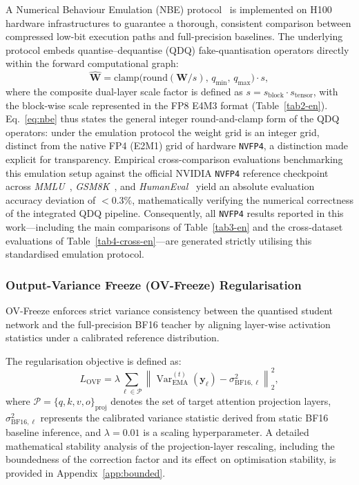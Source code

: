 \documentclass[a4paper,fleqn]{cas-sc}
\begin{document}
A Numerical Behaviour Emulation (NBE) protocol~\citep{NVIDIA2024TRTLLMReleaseNotes,NVIDIA2024TensorRTLLMDocs} is implemented on H100 hardware infrastructures to guarantee a thorough, consistent comparison between compressed low-bit execution paths and full-precision baselines. The underlying protocol embeds quantise--dequantise (QDQ) fake-quantisation operators directly within the forward computational graph:
\begin{equation}
\label{eq:nbe}
\widehat{\bm{W}} = \text{clamp}\!\bigl(\text{round}(\bm{W}/s),\,q_{\min},\,q_{\max}\bigr) \cdot s,
\end{equation}
where the composite dual-layer scale factor is defined as $s = s_{\text{block}} \cdot s_{\text{tensor}}$, with the block-wise scale represented in the FP8 E4M3 format (Table~\ref{tab2-en}). Eq.~\eqref{eq:nbe} thus states the general integer round-and-clamp form of the QDQ operators: under the emulation protocol the weight grid is an integer grid, distinct from the native FP4 (E2M1) grid of hardware \texttt{NVFP4}, a distinction made explicit for transparency. Empirical cross-comparison evaluations benchmarking this emulation setup against the official NVIDIA \texttt{NVFP4} reference checkpoint across \textit{MMLU}~\citep{30}, \textit{GSM8K}~\citep{31}, and \textit{HumanEval}~\citep{32} yield an absolute evaluation accuracy deviation of $< 0.3\%$, mathematically verifying the numerical correctness of the integrated QDQ pipeline. Consequently, all \texttt{NVFP4} results reported in this work---including the main comparisons of Table~\ref{tab3-en} and the cross-dataset evaluations of Table~\ref{tab4-cross-en}---are generated strictly utilising this standardised emulation protocol.

\subsubsection{Output-Variance Freeze (OV-Freeze) Regularisation}\label{sec:ovfreeze-method}

OV-Freeze enforces strict variance consistency between the quantised student network and the full-precision BF16 teacher by aligning layer-wise activation statistics under a calibrated reference distribution.

The regularisation objective is defined as:
\begin{equation}
\label{eq:ovf-loss}
L_{\mathrm{OVF}} = \lambda \sum_{\ell \in \mathcal{P}} \left\| \operatorname{Var}^{(t)}_{\mathrm{EMA}}(\bm{y}_\ell) - \sigma^2_{\mathrm{BF16},\ell} \right\|_2^2,
\end{equation}
where $\mathcal{P} = \{q, k, v, o\}_{\text{proj}}$ denotes the set of target attention projection layers, $\sigma^2_{\mathrm{BF16},\ell}$ represents the calibrated variance statistic derived from static BF16 baseline inference, and $\lambda = 0.01$ is a scaling hyperparameter. A detailed mathematical stability analysis of the projection-layer rescaling, including the boundedness of the correction factor and its effect on optimisation stability, is provided in Appendix~\ref{app:bounded}.
\end{document}
